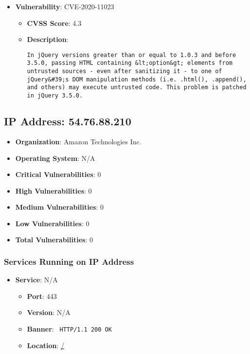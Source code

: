 \documentclass{article}
\begin{document}
\begin{itemize}
        \item \textbf{Vulnerability}: CVE-2020-11023
        \begin{itemize}
            \item \textbf{CVSS Score}:  4.3 
            \item \textbf{Description}:
            \parbox[t]{0.9\linewidth}{
                \verb|In jQuery versions greater than or equal to 1.0.3 and before 3.5.0, passing HTML containing &lt;option&gt; elements from untrusted sources - even after sanitizing it - to one of jQuery&#39;s DOM manipulation methods (i.e. .html(), .append(), and others) may execute untrusted code. This problem is patched in jQuery 3.5.0.|
            }
        \end{itemize}
    
\end{itemize}




\clearpage



\subsection*{IP Address: 54.76.88.210}

\begin{itemize}
    \item \textbf{Organization}: Amazon Technologies Inc.
    \item \textbf{Operating System}:  N/A 
    \item \textbf{Critical Vulnerabilities}: 0
    \item \textbf{High Vulnerabilities}: 0
    \item \textbf{Medium Vulnerabilities}: 0
    \item \textbf{Low Vulnerabilities}: 0
    \item \textbf{Total Vulnerabilities}: 0
\end{itemize}

\subsubsection*{Services Running on IP Address}

\begin{itemize}
    
        \item \textbf{Service}: N/A
        \begin{itemize}
            \item \textbf{Port}: 443
            \item \textbf{Version}:  N/A 
            \item \textbf{Banner}: \texttt{
                HTTP/1.1 200 OK
            }
            \item \textbf{Location}: \href{ / }{ / }
        \end{itemize}
    
\end{itemize}
\end{document}
